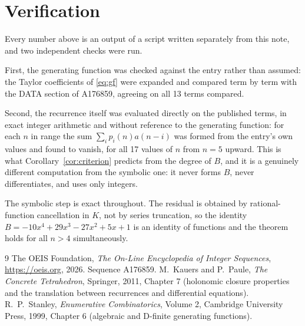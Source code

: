 \documentclass[11pt,a4paper]{article}
\theoremstyle{plain}
\theoremstyle{definition}
\begin{document}
\section{Verification}

Every number above is an output of a script written separately from this note, and two
independent checks were run.

First, the generating function was checked against the entry rather than assumed: the
Taylor coefficients of \eqref{eq:gf} were expanded and compared term by term with the DATA
section of A176859, agreeing on all 13 terms compared.

Second, the recurrence itself was evaluated directly on the published terms, in exact
integer arithmetic and without reference to the generating function: for each $n$ in range
the sum $\sum_{i}p_{i}(n)a(n-i)$ was formed from the entry's own values and found to
vanish, for all 17 values of $n$ from $n=5$ upward. This is what
Corollary~\ref{cor:criterion} predicts from the degree of $B$, and it is a genuinely
different computation from the symbolic one: it never forms $B$, never differentiates, and
uses only integers.

The symbolic step is exact throughout. The residual is obtained by rational-function
cancellation in $K$, not by series truncation, so the identity $B=- 10 x^{4} + 29 x^{3} - 27 x^{2} + 5 x + 1$ is an
identity of functions and the theorem holds for all $n>4$ simultaneously.

\begin{thebibliography}{9}
 The OEIS Foundation, \emph{The On-Line Encyclopedia of Integer Sequences},
\url{https://oeis.org}, 2026. Sequence A176859.
 M.~Kauers and P.~Paule, \emph{The Concrete Tetrahedron}, Springer, 2011,
Chapter 7 (holonomic closure properties and the translation between recurrences and
differential equations).
 R.~P.~Stanley, \emph{Enumerative Combinatorics}, Volume 2, Cambridge
University Press, 1999, Chapter 6 (algebraic and D-finite generating functions).
\end{thebibliography}
\end{document}
